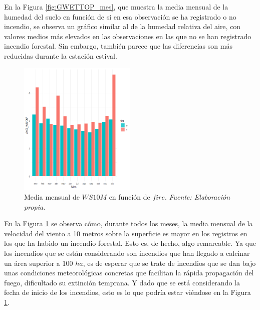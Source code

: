 \documentclass[12pt,a4paper,]{book}
\numberwithin{dummy}{section}
\theoremstyle{ocrenumbox}
\theoremstyle{blacknumex}
\theoremstyle{blacknumbox}
\theoremstyle{ocrenum}
\theoremstyle{ocrenum}
\begin{document}
En la Figura \ref{fig:GWETTOP_mes}, que muestra la media mensual de la
humedad del suelo en función de si en esa observación se ha registrado o
no incendio, se observa un gráfico similar al de la humedad relativa del
aire, con valores medios más elevados en las observaciones en las que no
se han registrado incendio forestal. Sin embargo, también parece que las
diferencias son más reducidas durante la estación estival.

\begin{figure}[H]
\centering
\includegraphics[width = 0.5\textwidth]{graficos/WS10M_mes.png}
\caption[Media mensual de $WS10M$ en función de $fire$]{Media mensual de $WS10M$ en función de $fire$. \it Fuente: Elaboración propia.}
\label{fig:WS10M_mes}
\end{figure}

En la Figura \ref{fig:WS10M_mes} se observa cómo, durante todos los
meses, la media mensual de la velocidad del viento a 10 metros sobre la
superficie es mayor en los registros en los que ha habido un incendio
forestal. Esto es, de hecho, algo remarcable. Ya que los incendios que
se están considerando son incendios que han llegado a calcinar un área
superior a 100 \(ha\), es de esperar que se trate de incendios que se
dan bajo unas condiciones meteorológicas concretas que facilitan la
rápida propagación del fuego, dificultado su extinción temprana. Y dado
que se está considerando la fecha de inicio de los incendios, esto es lo
que podría estar viéndose en la Figura \ref{fig:WS10M_mes}.
\end{document}
